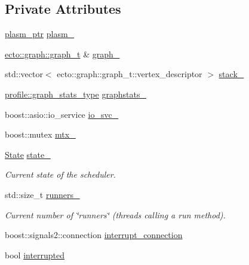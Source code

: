 \subsection*{Private Attributes}
\begin{DoxyCompactItemize}
\item 
\hyperlink{namespaceecto_a6b83be6cd685db71f03b14871653475f}{plasm\+\_\+ptr} \hyperlink{classecto_1_1scheduler_a9ccfb508a5bf75ec7ca69b475a7c7226}{plasm\+\_\+}
\item 
\hyperlink{structecto_1_1graph_1_1graph__t}{ecto\+::graph\+::graph\+\_\+t} \& \hyperlink{classecto_1_1scheduler_a79de9623f94d1003dc34f12fc69c5981}{graph\+\_\+}
\item 
std\+::vector$<$ ecto\+::graph\+::graph\+\_\+t\+::vertex\+\_\+descriptor $>$ \hyperlink{classecto_1_1scheduler_ad2b6561ebc08afd8cf8edaa39cb702b8}{stack\+\_\+}
\item 
\hyperlink{structecto_1_1profile_1_1graph__stats__type}{profile\+::graph\+\_\+stats\+\_\+type} \hyperlink{classecto_1_1scheduler_a6da29ce8fc4f4d2a1c451a577e049c62}{graphstats\+\_\+}
\item 
boost\+::asio\+::io\+\_\+service \hyperlink{classecto_1_1scheduler_af8f90a97a59811157c657cecb8512069}{io\+\_\+svc\+\_\+}
\item 
boost\+::mutex \hyperlink{classecto_1_1scheduler_a47a29f5a0e1f1ab8ce816b0c63442b5c}{mtx\+\_\+}
\item 
\hyperlink{classecto_1_1scheduler_a6b063d1c4bb9dad58d7ace61946b1200}{State} \hyperlink{classecto_1_1scheduler_a21d2aac4a8a2ef665942b7c9b741250c}{state\+\_\+}
\begin{DoxyCompactList}\small\item\em Current state of the scheduler. \end{DoxyCompactList}\item 
std\+::size\+\_\+t \hyperlink{classecto_1_1scheduler_a650d97445fe90ba4572d208430f71e20}{runners\+\_\+}
\begin{DoxyCompactList}\small\item\em Current number of \char`\"{}runners\char`\"{} (threads calling a run method). \end{DoxyCompactList}\item 
boost\+::signals2\+::connection \hyperlink{classecto_1_1scheduler_a7eedec3e00966ffa25a5172bdaa8b7c6}{interrupt\+\_\+connection}
\item 
bool \hyperlink{classecto_1_1scheduler_abbb89be5b75cc481087fc2b2b1f00147}{interrupted}
\end{DoxyCompactItemize}


